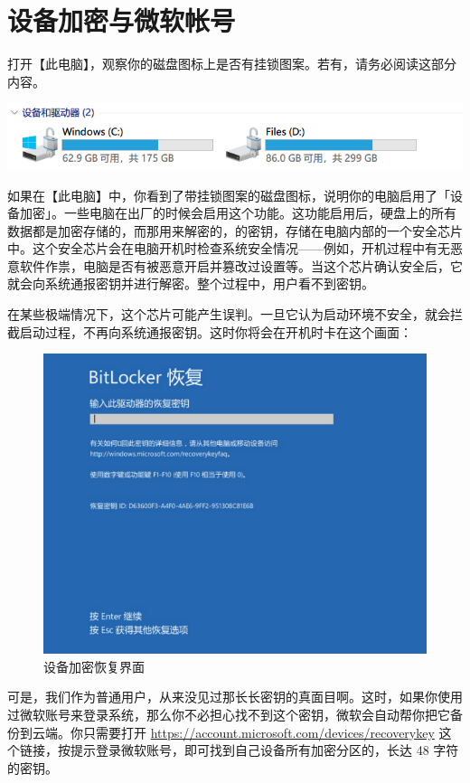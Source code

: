 {{{\section{设备加密与微软帐号}

\begin{warning}
  打开【此电脑】，观察你的磁盘图标上是否有挂锁图案。若有，请务必阅读这部分内容。
  
  \begin{center}
    \centering
    \includegraphics[width=.8\textwidth]{assets/advanced/BitLocker.png}
    \label{fig:BitLocker}
  \end{center}
\end{warning}

如果在【此电脑】中，你看到了带挂锁图案的磁盘图标，说明你的电脑启用了「设备加密」。一些电脑在出厂的时候会启用这个功能。这功能启用后，硬盘上的所有数据都是加密存储的，而那用来解密的，的密钥，存储在电脑内部的一个安全芯片中。这个安全芯片会在电脑开机时检查系统安全情况——例如，开机过程中有无恶意软件作祟，电脑是否有被恶意开启并篡改过设置等。当这个芯片确认安全后，它就会向系统通报密钥并进行解密。整个过程中，用户看不到密钥。

在某些极端情况下，这个芯片可能产生误判。一旦它认为启动环境不安全，就会拦截启动过程，不再向系统通报密钥。这时你将会在开机时卡在这个画面：

\begin{figure}[htb!]
  \centering
  \includegraphics[width=.6\textwidth]{assets/advanced/RecoverPass.png}
  \caption{设备加密恢复界面}
  \label{fig:RecoverPass}
\end{figure}

可是，我们作为普通用户，从来没见过那长长密钥的真面目啊。这时，如果你使用过微软账号来登录系统，那么你不必担心找不到这个密钥，微软会自动帮你把它备份到云端。你只需要打开 \url{https://account.microsoft.com/devices/recoverykey} 这个链接，按提示登录微软账号，即可找到自己设备所有加密分区的，长达 48 字符的密钥。

}}}
